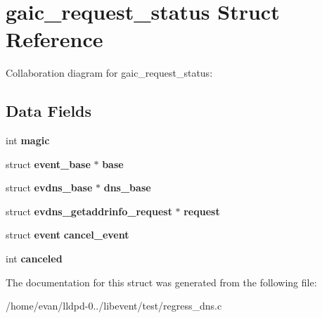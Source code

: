 \section{gaic\-\_\-request\-\_\-status \-Struct \-Reference}
\label{structgaic__request__status}


\-Collaboration diagram for gaic\-\_\-request\-\_\-status\-:
\subsection*{\-Data \-Fields}
\begin{DoxyCompactItemize}
\item 
int {\bfseries magic}\label{structgaic__request__status_a6480f97b5704e0c84200f69c08d46870}

\item 
struct {\bf event\-\_\-base} $\ast$ {\bfseries base}\label{structgaic__request__status_ab1a154f7530a81e9dd1d63fc6b98a5c7}

\item 
struct {\bf evdns\-\_\-base} $\ast$ {\bfseries dns\-\_\-base}\label{structgaic__request__status_ae25945e708ff97da16b4e5e5757ae580}

\item 
struct {\bf evdns\-\_\-getaddrinfo\-\_\-request} $\ast$ {\bfseries request}\label{structgaic__request__status_a2a5ec8565889ed1c8d4c9f3abfc44ad6}

\item 
struct {\bf event} {\bfseries cancel\-\_\-event}\label{structgaic__request__status_afb203cfacbc9a1a23ae70cc13e0b93fd}

\item 
int {\bfseries canceled}\label{structgaic__request__status_a7a04d6ad2bbf6f268250358467407c37}

\end{DoxyCompactItemize}


\-The documentation for this struct was generated from the following file\-:\begin{DoxyCompactItemize}
\item 
/home/evan/lldpd-\/0../libevent/test/regress\-\_\-dns.\-c\end{DoxyCompactItemize}
